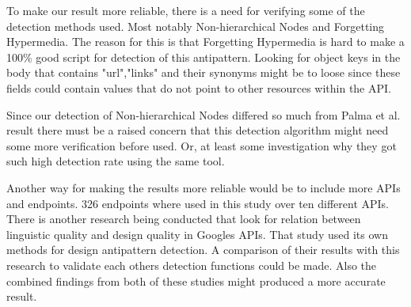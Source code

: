 To make our result more reliable, there is a need for verifying some of the detection methods used. Most notably Non-hierarchical Nodes and Forgetting Hypermedia. The reason for this is that Forgetting Hypermedia is hard to make a 100\% good script for detection of this antipattern. Looking for object keys in the body that contains "url","links" and their synonyms might be to loose since these fields could contain values that do not point to other resources within the API. 

Since our detection of Non-hierarchical Nodes differed so much from Palma et al. \cite{linguistic} result there must be a raised concern that this detection algorithm might need some more verification before used. Or, at least some investigation why they got such high detection rate using the same tool.

Another way for making the results more reliable would be to include more APIs and endpoints. 326 endpoints where used in this study over ten different APIs. There is another research being conducted that look for relation between linguistic quality and design quality in Googles APIs. That study used its own methods for design antipattern detection. A comparison of their results with this research to validate each others detection functions could be made. Also the combined findings from both of these studies might produced a more accurate result.